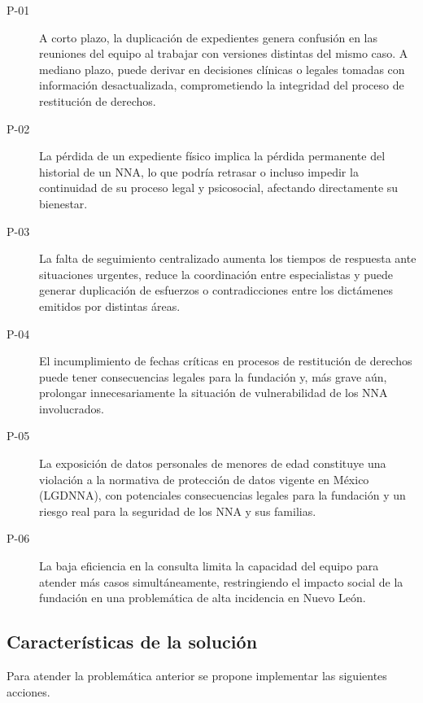 \begin{description}
	\item[P-01] A corto plazo, la duplicación de expedientes genera confusión en las 
	reuniones del equipo al trabajar con versiones distintas del mismo caso. A mediano 
	plazo, puede derivar en decisiones clínicas o legales tomadas con información 
	desactualizada, comprometiendo la integridad del proceso de restitución de derechos.
	
	\item[P-02] La pérdida de un expediente físico implica la pérdida permanente del 
	historial de un NNA, lo que podría retrasar o incluso impedir la continuidad de su 
	proceso legal y psicosocial, afectando directamente su bienestar.
	
	\item[P-03] La falta de seguimiento centralizado aumenta los tiempos de respuesta 
	ante situaciones urgentes, reduce la coordinación entre especialistas y puede generar 
	duplicación de esfuerzos o contradicciones entre los dictámenes emitidos por 
	distintas áreas.
	
	\item[P-04] El incumplimiento de fechas críticas en procesos de restitución de 
	derechos puede tener consecuencias legales para la fundación y, más grave aún, 
	prolongar innecesariamente la situación de vulnerabilidad de los NNA involucrados.
	
	\item[P-05] La exposición de datos personales de menores de edad constituye una 
	violación a la normativa de protección de datos vigente en México (LGDNNA), con potenciales 
	consecuencias legales para la fundación y un riesgo real para la seguridad de los NNA y sus familias.
	
	\item[P-06] La baja eficiencia en la consulta limita la capacidad del equipo para 
	atender más casos simultáneamente, restringiendo el impacto social de la fundación 
	en una problemática de alta incidencia en Nuevo León.
\end{description}

\subsection{Características de la solución}

Para atender la problemática anterior se propone implementar las siguientes acciones.

